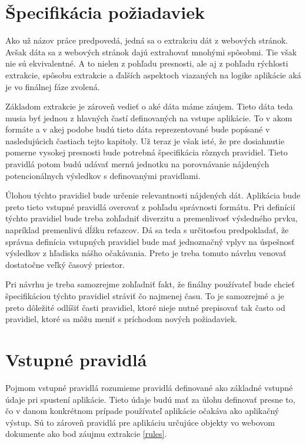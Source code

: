 \section{Špecifikácia požiadaviek}

Ako už názov práce predpovedá, jedná sa o extrakciu dát z webových stránok. Avšak dáta sa z webových stránok dajú extrahovať mnohými spôsobmi. Tie však nie sú ekvivalentné. A to nielen z pohľadu presnosti, ale aj z pohľadu rýchlosti extrakcie, spôsobu extrakcie a ďalších aspektoch viazaných na logike aplikácie aká je vo finálnej fáze zvolená.

Základom extrakcie je zároveň vedieť o aké dáta máme záujem. Tieto dáta teda musia byť jednou z hlavných častí definovaných na vstupe aplikácie. To v akom formáte a v akej podobe budú tieto dáta reprezentované bude popísané v nasledujúcich častiach tejto kapitoly. Už teraz je však isté, že pre dosiahnutie pomerne vysokej presnosti bude potrebná špecifikácia rôznych pravidiel. Tieto pravidlá potom budú udávať mernú jednotku na porovnávanie nájdených potencionálnych výsledkov s definovanými pravidlami.

Úlohou týchto pravidiel bude určenie relevantnosti nájdených dát. Aplikácia bude preto tieto vstupné pravidlá overovať z pohľadu správnosti formátu. Pri definícií týchto pravidiel bude treba zohľadniť diverzitu a premenlivosť výsledného prvku, napríklad premenlivú dĺžku reťazcov. Dá sa teda s určitosťou predpokladať, že správna definícia vstupných pravidiel bude mať jednoznačný vplyv na úspešnosť výsledkov z hľadiska nášho očakávania. Preto je treba tomuto návrhu venovať dostatočne veľký časový priestor.

Pri návrhu je treba samozrejme zohľadniť fakt, že finálny používateľ bude chcieť špecifikáciou týchto pravidiel stráviť čo najmenej času. To je samozrejmé a je preto dôležité odlíšiť časti pravidiel, ktoré nieje nutné prepisovať tak často od pravidiel, ktoré sa môžu meniť s príchodom nových požiadaviek.

\newpage
\section{Vstupné pravidlá}

Pojmom vstupné pravidlá rozumieme pravidlá definované ako základné vstupné údaje pri spustení aplikácie. Tieto údaje budú mať za úlohu definovať presne to, čo v danom konkrétnom prípade používateľ aplikácie očakáva ako aplikačný výstup. Sú to zároveň pravidlá pre aplikáciu určujúce objekty vo webovom dokumente ako bod záujmu extrakcie \ref{rules}.

